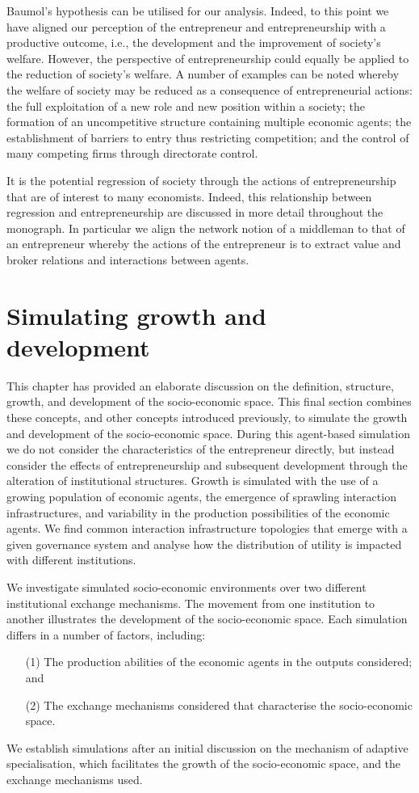Baumol's hypothesis can be utilised for our analysis. Indeed, to this point we have aligned our perception of the entrepreneur and entrepreneurship with a productive outcome, i.e., the development and the improvement of society's welfare. However, the perspective of entrepreneurship could equally be applied to the reduction of society's welfare. A number of examples can be noted whereby the welfare of society may be reduced as a consequence of entrepreneurial actions: the full exploitation of a new role and new position within a society; the formation of an uncompetitive structure containing multiple economic agents; the establishment of barriers to entry thus restricting competition; and the control of many competing firms through directorate control.

It is the potential regression of society through the actions of entrepreneurship that are of interest to many economists. Indeed, this relationship between regression and entrepreneurship are discussed in more detail throughout the monograph. In particular we align the network notion of a middleman to that of an entrepreneur whereby the actions of the entrepreneur is to extract value and broker relations and interactions between agents.

\section{Simulating growth and development}
\label{sec:Simulations}

This chapter has provided an elaborate discussion on the definition, structure, growth, and development of the socio-economic space. This final section combines these concepts, and other concepts introduced previously, to simulate the growth and development of the socio-economic space. During this agent-based simulation we do not consider the characteristics of the entrepreneur directly, but instead consider the effects of entrepreneurship and subsequent development through the alteration of institutional structures. Growth is simulated with the use of a growing population of economic agents, the emergence of sprawling interaction infrastructures, and variability in the production possibilities of the economic agents. We find common interaction infrastructure topologies that emerge with a given governance system and analyse how the distribution of utility is impacted with different institutions.

We investigate simulated socio-economic environments over two different institutional exchange mechanisms. The movement from one institution to another illustrates the development of the socio-economic space. Each simulation differs in a number of factors, including: 
\begin{itemize}
	\item[(1)] The production abilities of the economic agents in the outputs considered; and 
	\item[(2)] The exchange mechanisms considered that characterise the socio-economic space. 
\end{itemize}
We establish simulations after an initial discussion on the mechanism of adaptive specialisation, which facilitates the growth of the socio-economic space, and the exchange mechanisms used.

